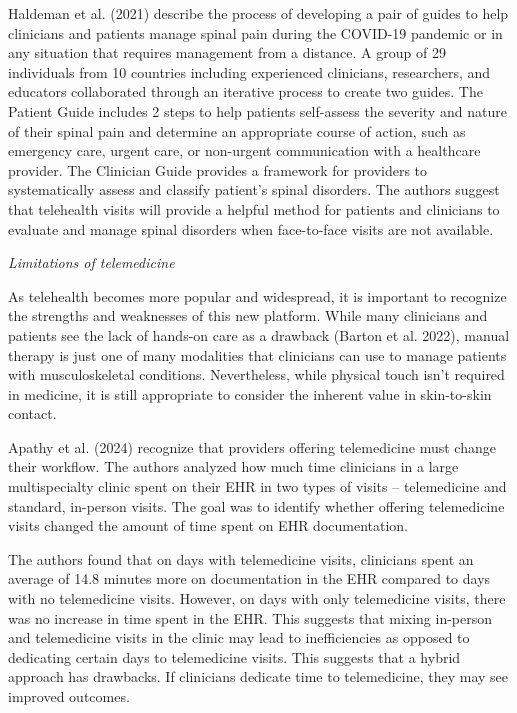\documentclass[
  letterpaper,
]{article}
\begin{document}
Haldeman et al. (2021) describe the process of developing a pair of
guides to help clinicians and patients manage spinal pain during the
COVID-19 pandemic or in any situation that requires management from a
distance. A group of 29 individuals from 10 countries including
experienced clinicians, researchers, and educators collaborated through
an iterative process to create two guides. The Patient Guide includes 2
steps to help patients self-assess the severity and nature of their
spinal pain and determine an appropriate course of action, such as
emergency care, urgent care, or non-urgent communication with a
healthcare provider. The Clinician Guide provides a framework for
providers to systematically assess and classify patient's spinal
disorders. The authors suggest that telehealth visits will provide a
helpful method for patients and clinicians to evaluate and manage spinal
disorders when face-to-face visits are not available.

\emph{Limitations of telemedicine}

As telehealth becomes more popular and widespread, it is important to
recognize the strengths and weaknesses of this new platform. While many
clinicians and patients see the lack of hands-on care as a drawback
(Barton et al. 2022), manual therapy is just one of many modalities that
clinicians can use to manage patients with musculoskeletal conditions.
Nevertheless, while physical touch isn't required in medicine, it is
still appropriate to consider the inherent value in skin-to-skin
contact.

Apathy et al. (2024) recognize that providers offering telemedicine must
change their workflow. The authors analyzed how much time clinicians in
a large multispecialty clinic spent on their EHR in two types of visits
-- telemedicine and standard, in-person visits. The goal was to identify
whether offering telemedicine visits changed the amount of time spent on
EHR documentation.

The authors found that on days with telemedicine visits, clinicians
spent an average of 14.8 minutes more on documentation in the EHR
compared to days with no telemedicine visits. However, on days with only
telemedicine visits, there was no increase in time spent in the EHR.
This suggests that mixing in-person and telemedicine visits in the
clinic may lead to inefficiencies as opposed to dedicating certain days
to telemedicine visits. This suggests that a hybrid approach has
drawbacks. If clinicians dedicate time to telemedicine, they may see
improved outcomes.
\end{document}

